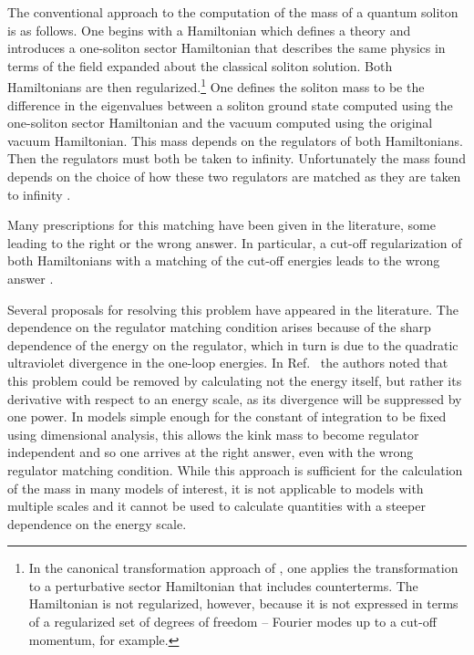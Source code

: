 \def\letter{0}\def\pr{0}\documentclass[a4paper,12pt, epsfig]{article}
\makeatletter
\renewcommand{\(}{\begin{equation}}
\renewcommand{\)}{end{equation} \vspace{-.05in}\linebreak}
\renewcommand{\=}{\hspace{-.03in}=\hspace{-.02in}}
\renewcommand{\thefootnote}{\alph{footnote}}
\renewcommand{\(}{\begin{equation}}
\renewcommand{\)}{\end{equation}}
\renewcommand{\(}{\begin{equation}}
\renewcommand{\)}{\end{equation}}
\def\section{\@startsection{section}{1}{\z@}{3.5ex plus 1ex minus  .2ex}{2.3ex plus .2ex}{\large\bf}}
\makeatother
\begin{document}
%
\setcounter{footnote}{0}
\renewcommand{\thefootnote}{\arabic{footnote}}

\section{Introduction}

The conventional approach \cite{dhn2,rajaraman,physrept04,takyi}  to the computation of the mass of a quantum soliton is as follows.  One begins with a Hamiltonian which defines a theory and introduces a one-soliton sector Hamiltonian that describes the same physics in terms of the field expanded about the classical soliton solution.     Both Hamiltonians are then regularized.\footnote{{In the canonical transformation approach of \cite{gjs}, one applies the transformation to a perturbative sector Hamiltonian that includes counterterms.  The Hamiltonian is not regularized, however, because it is not expressed in terms of a regularized set of degrees of freedom -- Fourier modes up to a cut-off momentum, for example.}}  One defines the soliton mass to be the difference in the eigenvalues between a soliton ground state computed using the one-soliton sector Hamiltonian and the vacuum computed using the original vacuum Hamiltonian.  This mass depends on the regulators of both Hamiltonians.  Then the regulators must both be taken to infinity.  Unfortunately the mass found depends on the choice of how these two regulators are matched as they are taken to infinity \cite{rebhan}. 

Many prescriptions for this matching have been given in the literature, some leading to the right or the wrong answer.  In particular, a cut-off regularization of both Hamiltonians with a matching of the cut-off energies leads to the wrong answer \cite{rebhan}.  

Several proposals for resolving this problem have appeared in the literature.  The dependence on the regulator matching condition arises because of the sharp dependence of the energy on the regulator, which in turn is due to the quadratic ultraviolet divergence in the one-loop energies.  In Ref.~\cite{nastase} the authors noted that this problem could be removed by calculating not the energy itself, but rather its derivative with respect to an energy scale, as its divergence will be suppressed by one power.  In models simple enough for the constant of integration to be fixed using dimensional analysis, this allows the kink mass to become regulator independent and so one arrives at the right answer, even with the wrong regulator matching condition.  While this approach is sufficient for the calculation of the mass in many models of interest, it is not applicable to models with multiple scales and it cannot be used to calculate quantities with a steeper dependence on the energy scale.  
\end{document}
